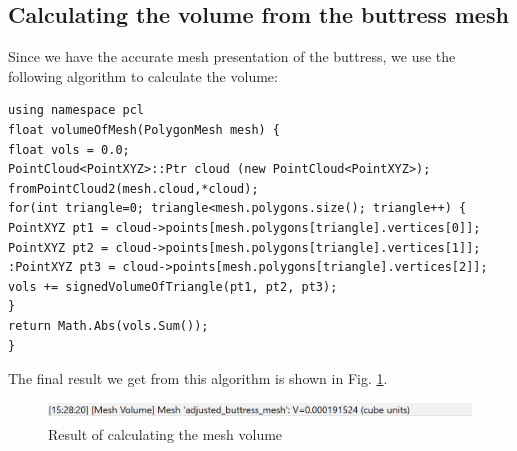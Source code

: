 \documentclass[runningheads,a4paper]{llncs}
\begin{document}
\subsection{Calculating the volume from the buttress mesh}
Since we have the accurate mesh presentation of the buttress, we use the following algorithm to calculate the volume:
\begin{lstlisting}
using namespace pcl
float volumeOfMesh(PolygonMesh mesh) { 
float vols = 0.0; 
PointCloud<PointXYZ>::Ptr cloud (new PointCloud<PointXYZ>); fromPointCloud2(mesh.cloud,*cloud); 
for(int triangle=0; triangle<mesh.polygons.size(); triangle++) { 
PointXYZ pt1 = cloud->points[mesh.polygons[triangle].vertices[0]]; 
PointXYZ pt2 = cloud->points[mesh.polygons[triangle].vertices[1]]; 
:PointXYZ pt3 = cloud->points[mesh.polygons[triangle].vertices[2]]; 
vols += signedVolumeOfTriangle(pt1, pt2, pt3); 
} 
return Math.Abs(vols.Sum()); 
}
\end{lstlisting}
The final result we get from this algorithm is shown in Fig. \ref{fig:mesh-volume}.

\begin{figure}
\centering
\includegraphics[scale=0.4]{finalresults.PNG}
\caption{Result of calculating the mesh volume}
\label{fig:mesh-volume}
\end{figure}
\end{document}
